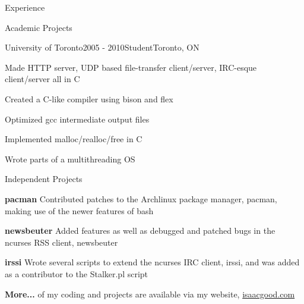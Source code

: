 \documentclass{resume}
\begin{document}
\begin{rSection}{Experience}
\begin{comment}
    \begin{rSubsection}{Rent Magic}{May 2006 - Aug 2006}{Software Developer}{Toronto, ON}
      \item Designed and implemented a PDA based front end and server backend to interact with a MySQL database producing a valuable product for Rent Magic
      \item Designed API structure, application structure and UI layout, data protocol creating a framework that can be used in the future for many other projects
      \item Kept supervisor up to date on progress and impediments, keeping the project on schedule
      \item Tested application, ensuring maximum customer satisfaction
    \end{rSubsection}
\end{comment}

  \end{rSection}

  \begin{rSection}{Academic Projects}
    \begin{rSubsection}{University of Toronto}{2005 - 2010}{Student}{Toronto, ON}
      \item Made HTTP server, UDP based file-transfer client/server, IRC-esque client/server all in C
      \item Created a C-like compiler using bison and flex
      \item Optimized gcc intermediate output files
      \item Implemented malloc/realloc/free in C
      \item Wrote parts of a multithreading OS
    \end{rSubsection}
  \end{rSection}

  \begin{rSection}{Independent Projects}
    \begin{rSubsection}{}{}{}{}
      \item \textbf{pacman} Contributed patches to the Archlinux package manager, pacman, making use of the newer features of bash
      \item \textbf{newsbeuter} Added features as well as debugged and patched bugs in the ncurses RSS client, newsbeuter
      \item \textbf{irssi} Wrote several scripts to extend the ncurses IRC client, irssi, and was added as a contributor to the Stalker.pl script
      \item \textbf{More...} of my coding and projects are available via my website, \href{http://www.isaacgood.com/}{isaacgood.com}
    \end{rSubsection}
  \end{rSection}
\end{document}
